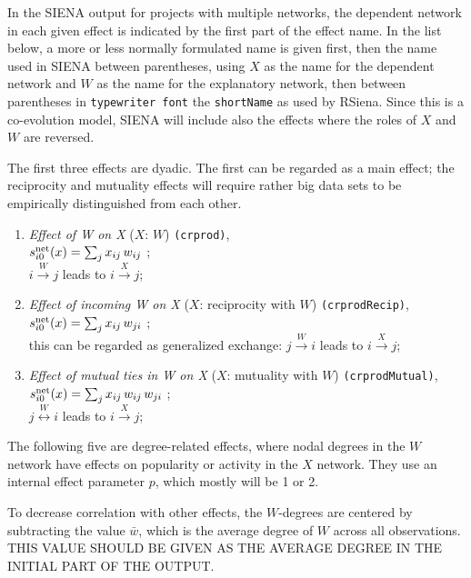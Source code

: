 \documentclass[a4paper,fleqn,11pt]{article}
\newcommand{\+}{\, + \,}
\newcommand{\vit}{\theenumi}
\newcommand{\rs}{{\sf RSiena}}
\newcommand{\SI}{{\sf SIENA }}
\newcounter{savenumi}
\begin{document}
In the \SI output for projects with multiple networks,
the dependent network in each given effect is indicated by
the first part of the effect name.
In the list below, a more or less normally formulated name is given first,
then the name used in \SI between parentheses,
using $X$ as the name for the dependent network and $W$
as the name for the explanatory network,
then between parentheses in \texttt{typewriter font} the \texttt{shortName}
as used by \rs.
Since this is a co-evolution model, \SI will include also the effects
where the roles of $X$ and $W$ are reversed.

The first three effects are dyadic. The first can be regarded
as a main effect; the reciprocity and mutuality effects
will require rather big data sets to be empirically distinguished
from each other.
\begin{enumerate}
 \item {\em Effect of W on X} ($X$: $W$)  \texttt{(crprod)},\\
 $s^{\rm net}_{i\vit}(x) = \sum_j x_{ij} \, w_{ij}  $ ;\\
 $i \stackrel{W}{\rightarrow} j$ leads to  $i \stackrel{X}{\rightarrow} j$;

 \item {\em Effect of incoming W on X} ($X$: reciprocity with $W$)  \texttt{(crprodRecip)},\\
 $s^{\rm net}_{i\vit}(x) = \sum_j x_{ij} \, w_{ji}  $ ;\\
 this can be regarded as generalized exchange:
 $j \stackrel{W}{\rightarrow} i$ leads to  $i \stackrel{X}{\rightarrow} j$;

 \item {\em Effect of mutual ties in W on X} ($X$: mutuality with $W$)  \texttt{(crprodMutual)},\\
 $s^{\rm net}_{i\vit}(x) = \sum_j x_{ij} \, w_{ij} \, w_{ji}  $ ;\\
 $j \stackrel{W}{\leftrightarrow} i$ leads to  $i \stackrel{X}{\rightarrow} j$;
\setcounter{savenumi}{\value{enumi}}
\end{enumerate}
\smallskip
The following five are degree-related effects, where nodal degrees
in the $W$ network have effects on popularity or activity in the
$X$  network. They use an internal effect parameter $p$, which
mostly will be 1 or 2.

To decrease correlation with other effects, the
$W$-degrees are centered by subtracting the value $\bar w$,
which is the average degree of $W$ across all observations.\\
THIS VALUE SHOULD BE GIVEN AS THE AVERAGE DEGREE IN THE INITIAL PART
OF THE OUTPUT.
\end{document}
